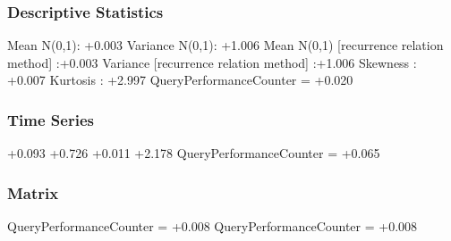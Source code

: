 \documentclass[9pt]{article}
\theoremstyle{plain}
\theoremstyle{definition}
\theoremstyle{remark}
\numberwithin{equation}{section}
\begin{document}
\subsubsection{Descriptive Statistics}
Mean N(0,1): +0.003
Variance N(0,1): +1.006
Mean N(0,1) [recurrence relation method] :+0.003
Variance [recurrence relation method] :+1.006
Skewness : +0.007
Kurtosis : +2.997
QueryPerformanceCounter  =  +0.020
\subsubsection{Time Series }
+0.093
+0.726
+0.011
+2.178
QueryPerformanceCounter  =  +0.065
\subsubsection{Matrix}
QueryPerformanceCounter  =  +0.008
QueryPerformanceCounter  =  +0.008
\end{document}
